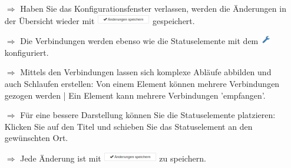 \documentclass{article}
\begin{document}
\begin{multicols}{2}

\begin{tcolorbox}[colback=blue!5,colframe=blue!40!black,title=Workflows konfigurieren 2]
\begin{itemize}
  \item[$\Longrightarrow$] Haben Sie das Konfigurationsfenster verlassen, werden die Änderungen in der Übersicht wieder mit \includegraphics[height=12pt]{Icons/AenderungenSpeichern.jpg} gespeichert.
	\item[$\Longrightarrow$] Die Verbindungen werden ebenso wie die Statuselemente mit dem \includegraphics[height=12pt]{Icons/Schraubenschluessel.jpg} konfiguriert.
  \item[$\Longrightarrow$] Mittels den Verbindungen lassen sich komplexe Abläufe abbilden und auch Schlaufen erstellen: Von einem Element können mehrere Verbindungen gezogen werden | Ein Element kann mehrere Verbindungen 'empfangen'.
  \item[$\Longrightarrow$] Für eine bessere Darstellung können Sie die Statuselemente platzieren: Klicken Sie auf den Titel und schieben Sie das Statuselement an den gewünschten Ort.
  \item[$\Longrightarrow$] Jede Änderung ist mit \includegraphics[height=12pt]{Icons/AenderungenSpeichern.jpg} zu speichern.

\end{itemize}
\end{tcolorbox}



\end{multicols}
\end{document}
